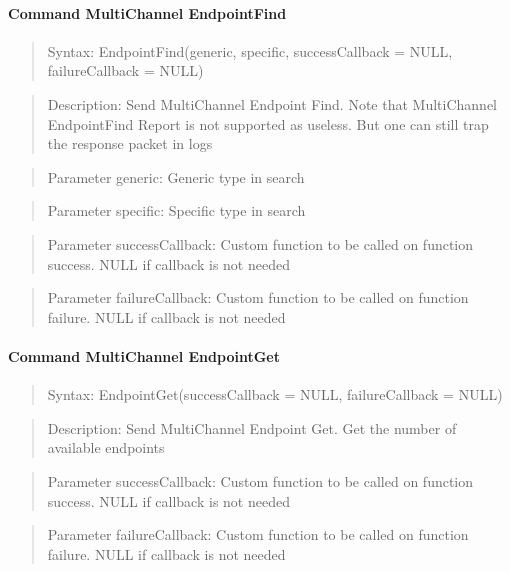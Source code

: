 \paragraph{Command MultiChannel EndpointFind}
\begin{quote}Syntax: EndpointFind(generic, specific, successCallback = NULL, failureCallback = NULL)\end{quote}
\begin{quote}Description: Send MultiChannel Endpoint Find. Note that MultiChannel EndpointFind Report is not supported as useless. But one can still trap the response packet in logs\end{quote}
\begin{quote}Parameter generic: Generic type in search\end{quote}
\begin{quote}Parameter specific: Specific type in search\end{quote}
\begin{quote}Parameter successCallback: Custom function to be called on function success. NULL if callback is not needed\end{quote}
\begin{quote}Parameter failureCallback: Custom function to be called on function failure. NULL if callback is not needed\end{quote}


\paragraph{Command MultiChannel EndpointGet}
\begin{quote}Syntax: EndpointGet(successCallback = NULL, failureCallback = NULL)\end{quote}
\begin{quote}Description: Send MultiChannel Endpoint Get. Get the number of available endpoints\end{quote}
\begin{quote}Parameter successCallback: Custom function to be called on function success. NULL if callback is not needed\end{quote}
\begin{quote}Parameter failureCallback: Custom function to be called on function failure. NULL if callback is not needed\end{quote}


